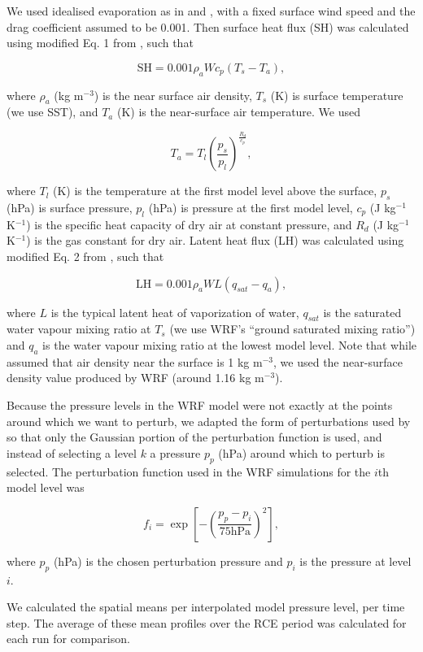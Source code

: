 \documentclass[draft]{agujournal2019}
\begin{document}
We used idealised evaporation as in  and
, with a fixed surface wind speed and the drag
coefficient assumed to be 0.001. Then surface heat flux (SH) was calculated
using modified Eq. 1 from , such that

$$
\textrm{SH} = 0.001 \rho_a W c_p (T_s - T_a),
$$

\noindent where $\rho_a$ (kg m$^{-3}$) is the near surface air density, $T_s$
(K) is surface temperature (we use SST), and $T_a$ (K) is the near-surface air
temperature. We used 

$$
T_a = T_l \left(\frac{p_s}{p_l}\right)^{\frac{R_d}{c_p}},
$$

\noindent where $T_l$ (K) is the temperature at the first model level above the
surface, $p_s$ (hPa) is surface pressure, $p_l$ (hPa) is pressure at the first
model level, $c_p$ (J kg$^{-1}$ K$^{-1}$) is the specific heat capacity of dry
air at constant pressure, and $R_d$ (J kg$^{-1}$ K$^{-1}$) is the gas constant
for dry air. Latent heat flux (LH) was calculated using modified Eq. 2 from
, such that

$$
\textrm{LH} = 0.001 \rho_a W L (q_{sat} - q_a),
$$

\noindent where $L$ is the typical latent heat of vaporization of water,
$q_{sat}$ is the saturated water vapour mixing ratio at $T_s$ (we use WRF's
``ground saturated mixing ratio'') and $q_a$ is the water vapour mixing ratio at
the lowest model level. Note that while  assumed that air
density near the surface is 1 kg m$^{-3}$, we used the near-surface density
value produced by WRF (around 1.16 kg m$^{-3}$).

Because the pressure levels in the WRF model were not exactly at the points
around which we want to perturb, we adapted the form of perturbations used by
 so that only the Gaussian portion of the perturbation
function is used, and instead of selecting a level $k$ a pressure $p_p$ (hPa)
around which to perturb is selected. The perturbation function used in the WRF
simulations for the $i$th model level was

$$
f_i = \exp\left[ - \left( \frac{p_p - p_i}{75 \textrm{hPa}}\right)^2 \right],
$$

\noindent where $p_p$ (hPa) is the chosen perturbation pressure and $p_i$ is the
pressure at level $i$.

We calculated the spatial means per interpolated model pressure level, per time
step. The average of these mean profiles over the RCE period was calculated for
each run for comparison.
\end{document}
